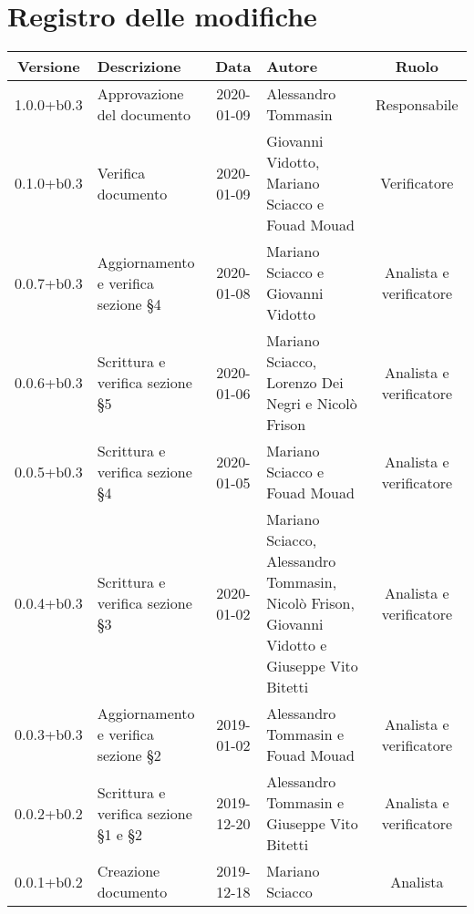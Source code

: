 \section*{Registro delle modifiche}

\begin{center}
	\begin{longtable}{|c|p{3cm}|c|p{4cm}|c|}
	\hline
	\rowcolor{lighter-grayer}
	\textbf{Versione} & \textbf{Descrizione} & \textbf{Data} & \textbf{Autore} & \textbf{Ruolo} \\
	\hline
	\endfirsthead

	1.0.0+b0.3 & Approvazione del documento & 2020-01-09 & Alessandro Tommasin & Responsabile \\
	\hline
	0.1.0+b0.3 & Verifica documento & 2020-01-09 & Giovanni Vidotto, Mariano Sciacco e Fouad Mouad & Verificatore \\
	\hline
	0.0.7+b0.3 & Aggiornamento e verifica sezione \S4 & 2020-01-08 & Mariano Sciacco e Giovanni Vidotto & Analista e verificatore\\
	\hline
	0.0.6+b0.3 & Scrittura e verifica sezione \S5 & 2020-01-06 & Mariano Sciacco, Lorenzo Dei Negri e Nicolò Frison & Analista e verificatore \\
	\hline
	0.0.5+b0.3 & Scrittura e verifica sezione \S4 & 2020-01-05 & Mariano Sciacco e Fouad Mouad & Analista e verificatore \\
	\hline
	0.0.4+b0.3 & Scrittura e verifica sezione \S3 & 2020-01-02 & Mariano Sciacco, Alessandro Tommasin, Nicolò Frison, Giovanni Vidotto e Giuseppe Vito Bitetti & Analista e verificatore \\
	\hline
	0.0.3+b0.3 & Aggiornamento e verifica sezione \S2 & 2019-01-02 & Alessandro Tommasin e Fouad Mouad & Analista e verificatore \\
	\hline
	0.0.2+b0.2 & Scrittura e verifica sezione \S1 e \S2 & 2019-12-20 & Alessandro Tommasin e Giuseppe Vito Bitetti & Analista e verificatore \\
	\hline
	0.0.1+b0.2 & Creazione documento & 2019-12-18 & Mariano Sciacco & Analista \\
	\hline

	\end{longtable}
\end{center}
